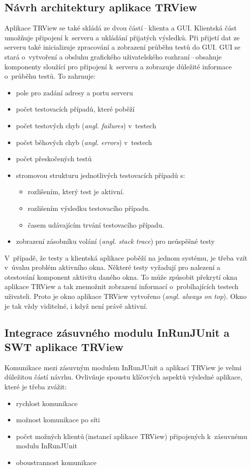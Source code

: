     \subsection{Návrh architektury aplikace TRView}
    Aplikace TRView se také skládá ze dvou částí\,--\,klienta a GUI. Klientská část umožňuje připojení k~serveru a ukládání přijatých výsledků. Při přijetí dat ze serveru také inicializuje zpracování a zobrazení průběhu testů do GUI. GUI se stará o~vytvoření a obsluhu grafického uživatelského rozhraní\,--\,obsahuje komponenty sloužící pro připojení k~serveru a zobrazuje důležité informace o~průběhu testů. To zahrnuje:
    \begin{itemize}
     \item pole pro zadání adresy a portu serveru
     \item počet testovacích případů, které poběží
     \item počet testových chyb (\emph{angl. failures}) v~testech
     \item počet běhových chyb (\emph{angl. errors}) v~testech
     \item počet přeskočených testů
     \item stromovou strukturu jednotlivých testovacích případů s:
     \begin{itemize}
      \item rozlišením, který test je aktivní.
      \item rozlišením výsledku testovacího případu.
      \item časem udávajícím trvání testovacího případu.
     \end{itemize}
     \item zobrazení zásobníku volání (\emph{angl. stack trace}) pro neúspěšné testy
    \end{itemize}

    \noindent
    V~případě, že testy a klientská aplikace poběží na jednom systému, je třeba vzít v~úvahu problém aktivního okna. Některé testy vyžadují pro nalezení a otestování komponent aktivitu daného okna. To může způsobit překrytí okna aplikace TRView a tak znemožnit zobrazení informací o~probíhajících testech uživateli. Proto je okno aplikace TRView vytvořeno (\emph{angl. always on top}). Okno je tak vždy viditelné, i když není právě aktivní.

    \subsection{Integrace zásuvného modulu InRunJUnit a SWT aplikace TRView}
    Komunikace mezi zásuvným modulem InRunJUnit a aplikací TRView je velmi důležitou částí návrhu. Ovlivňuje spoustu klíčových aspektů výsledné aplikace, které je třeba zvážit:
    \begin{itemize}
     \item rychlost komunikace
     \item možnost komunikace po síti
     \item počet možných klientů\,(instancí aplikace TRView) připojených k~zásuvnému modulu InRunJUnit
     \item oboustrannost komunikace
    \end{itemize}

